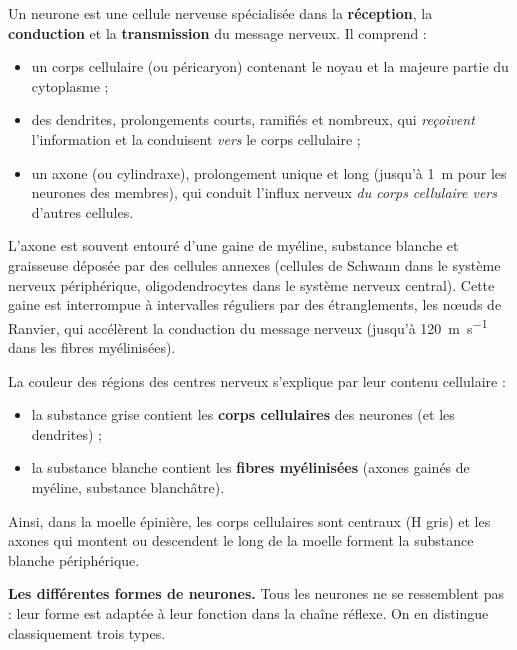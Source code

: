 \documentclass[11pt]{article}
\newcommand{\cle}[1]{{\popxbold\color{popdark}#1}}
\begin{document}
\begin{definition}[Neurone]
Un \cle{neurone} est une cellule nerveuse spécialisée dans la \textbf{réception}, la \textbf{conduction} et la \textbf{transmission} du message nerveux. Il comprend :
\begin{itemize}
\item un \cle{corps cellulaire} (ou péricaryon) contenant le noyau et la majeure partie du cytoplasme ;
\item des \cle{dendrites}, prolongements courts, ramifiés et nombreux, qui \emph{reçoivent} l'information et la conduisent \emph{vers} le corps cellulaire ;
\item un \cle{axone} (ou cylindraxe), prolongement unique et long (jusqu'à \SI{1}{m} pour les neurones des membres), qui conduit l'influx nerveux \emph{du corps cellulaire vers} d'autres cellules.
\end{itemize}
L'axone est souvent entouré d'une \cle{gaine de myéline}, substance blanche et graisseuse déposée par des cellules annexes (cellules de Schwann dans le système nerveux périphérique, oligodendrocytes dans le système nerveux central). Cette gaine est interrompue à intervalles réguliers par des étranglements, les \cle{nœuds de Ranvier}, qui accélèrent la conduction du message nerveux (jusqu'à \SI{120}{m.s^{-1}} dans les fibres myélinisées).
\end{definition}

\begin{propriete}
La couleur des régions des centres nerveux s'explique par leur contenu cellulaire :
\begin{itemize}
\item la \cle{substance grise} contient les \textbf{corps cellulaires} des neurones (et les dendrites) ;
\item la \cle{substance blanche} contient les \textbf{fibres myélinisées} (axones gainés de myéline, substance blanchâtre).
\end{itemize}
Ainsi, dans la moelle épinière, les corps cellulaires sont centraux (H gris) et les axones qui montent ou descendent le long de la moelle forment la substance blanche périphérique.
\end{propriete}

\textbf{Les différentes formes de neurones.} Tous les neurones ne se ressemblent pas : leur forme est adaptée à leur fonction dans la chaîne réflexe. On en distingue classiquement trois types.
\end{document}
